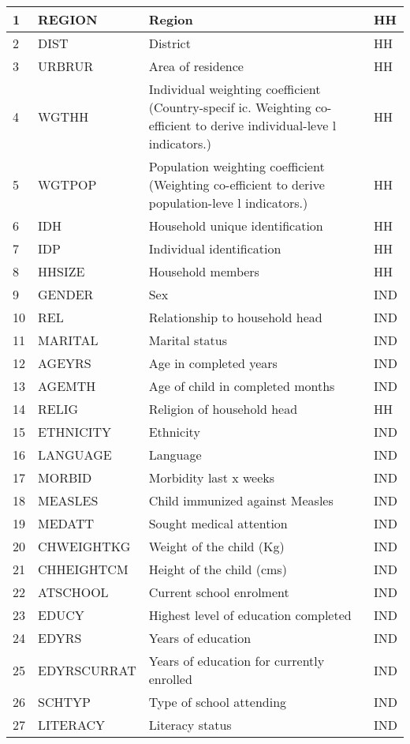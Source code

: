 \documentclass[letterpaper,10pt,english]{sphinxmanual}
\begin{document}
\begin{savenotes}
\begin{longtable}{|l|l|l|l|}
1
&
REGION
&
Region
&
HH
\\
\hline
2
&
DIST
&
District
&
HH
\\
\hline
3
&
URBRUR
&
Area of
residence
&
HH
\\
\hline
4
&
WGTHH
&
Individual
weighting
coefficient
(Country-specif
ic.
Weighting
co-efficient to
derive
individual-leve
l
indicators.)
&
HH
\\
\hline
5
&
WGTPOP
&
Population
weighting
coefficient
(Weighting
co-efficient
to derive
population-leve
l
indicators.)
&
HH
\\
\hline
6
&
IDH
&
Household
unique
identification
&
HH
\\
\hline
7
&
IDP
&
Individual
identification
&
HH
\\
\hline
8
&
HHSIZE
&
Household
members
&
HH
\\
\hline
9
&
GENDER
&
Sex
&
IND
\\
\hline
10
&
REL
&
Relationship to
household head
&
IND
\\
\hline
11
&
MARITAL
&
Marital status
&
IND
\\
\hline
12
&
AGEYRS
&
Age in
completed years
&
IND
\\
\hline
13
&
AGEMTH
&
Age of child in
completed
months
&
IND
\\
\hline
14
&
RELIG
&
Religion of
household head
&
HH
\\
\hline
15
&
ETHNICITY
&
Ethnicity
&
IND
\\
\hline
16
&
LANGUAGE
&
Language
&
IND
\\
\hline
17
&
MORBID
&
Morbidity last
x weeks
&
IND
\\
\hline
18
&
MEASLES
&
Child immunized
against Measles
&
IND
\\
\hline
19
&
MEDATT
&
Sought medical
attention
&
IND
\\
\hline
20
&
CHWEIGHTKG
&
Weight of the
child (Kg)
&
IND
\\
\hline
21
&
CHHEIGHTCM
&
Height of the
child (cms)
&
IND
\\
\hline
22
&
ATSCHOOL
&
Current school
enrolment
&
IND
\\
\hline
23
&
EDUCY
&
Highest level
of education
completed
&
IND
\\
\hline
24
&
EDYRS
&
Years of
education
&
IND
\\
\hline
25
&
EDYRSCURRAT
&
Years of
education for
currently
enrolled
&
IND
\\
\hline
26
&
SCHTYP
&
Type of school
attending
&
IND
\\
\hline
27
&
LITERACY
&
Literacy status
&
IND

\end{longtable}
\end{savenotes}
\end{document}

